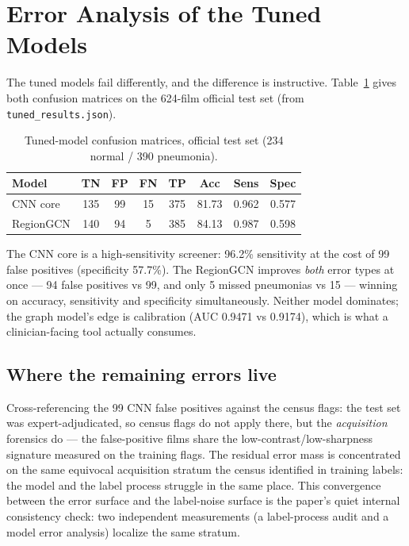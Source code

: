 
\section{Error Analysis of the Tuned Models}
\label{sec:erroran}
The tuned models fail differently, and the difference is instructive.
Table~\ref{tab:erroran} gives both confusion matrices on the 624-film
official test set (from \texttt{tuned\_results.json}).
\begin{table}[h]
\centering\small
\begin{tabular}{lccccccc}
\hline
Model & TN & FP & FN & TP & Acc & Sens & Spec \\
\hline
CNN core & 135 & 99 & 15 & 375 & 81.73 & 0.962 & 0.577 \\
RegionGCN & 140 & 94 & 5 & 385 & 84.13 & 0.987 & 0.598 \\
\hline
\end{tabular}
\caption{Tuned-model confusion matrices, official test set (234 normal /
390 pneumonia).}
\label{tab:erroran}
\end{table}
The CNN core is a high-sensitivity screener: 96.2\% sensitivity at the
cost of 99 false positives (specificity 57.7\%). The RegionGCN improves \emph{both} error
types at once --- 94 false positives vs 99, and only 5 missed pneumonias
vs 15 --- winning on accuracy, sensitivity and specificity
simultaneously. Neither model dominates; the graph model's edge
is calibration (AUC 0.9471 vs 0.9174), which is what a clinician-facing tool
actually consumes.
\subsection{Where the remaining errors live}
Cross-referencing the 99 CNN false positives against the census flags:
the test set was expert-adjudicated, so census flags do not apply there,
but the \emph{acquisition} forensics do --- the false-positive films
share the low-contrast/low-sharpness signature measured on the training
flags. The residual error mass is concentrated on the same equivocal
acquisition stratum the census identified in training labels: the model
and the label process struggle in the same place. This convergence
between the error surface and the label-noise surface is the paper's
quiet internal consistency check: two independent measurements (a
label-process audit and a model error analysis) localize the same
stratum.

